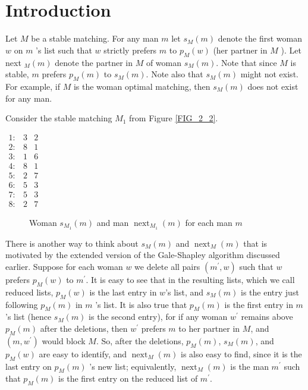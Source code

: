 \section{Introduction}
Let $M$ be a stable matching. For any man $m$ let $s_M(m)$ denote the first woman $w$ on $m$ 's list such that $w$ strictly prefers $m$ to $p_M(w)$ (her partner in $M$ ). Let next $_M(m)$ denote the partner in $M$ of woman $s_M(m)$. Note that since $M$ is stable, $m$ prefers $p_M(m)$ to $s_M(m)$. Note also that $s_M(m)$ might not exist. For example, if $M$ is the woman optimal matching, then $s_M(m)$ does not exist for any man.

\begin{exmp}\label{exmp_3_1}
Consider the stable matching $M_1$ from Figure \ref{FIG_2_2}. 

\begin{center}
    $\begin{array}{lll}1: & 3 & 2 \\ 2: & 8 & 1 \\ 3: & 1 & 6 \\ 4: & 8 & 1 \\ 5: & 2 & 7 \\ 6: & 5 & 3 \\ 7: & 5 & 3 \\ 8: & 2 & 7\end{array}$

    \begin{figure}[ht]
  \centering
  \caption{Woman $s_{M_1}(m)$ and man $\operatorname{next}_{M_1}(m)$ for each man $m$}
  \label{FIG_3_1}
\end{figure}
\end{center}
\end{exmp}

There is another way to think about $s_M(m)$ and $\operatorname{next}_M(m)$ that is motivated by the extended version of the Gale-Shapley algorithm discussed earlier. Suppose for each woman $w$ we delete all pairs $\left(m^{\prime}, w\right)$ such that $w$ prefers $p_M(w)$ to $m^{\prime}$. It is easy to see that in the resulting lists, which we call reduced lists, $p_M(w)$ is the last entry in $w$'s list, and $s_M(m)$ is the entry just following $p_M(m)$ in $m$ 's list. It is also true that $p_M(m)$ is the first entry in $m$'s list (hence $s_M(m)$ is the second entry), for if any woman $w^{\prime}$ remains above $p_M(m)$ after the deletions, then $w^{\prime}$ prefers $m$ to her partner in $M$, and $\left(m, w^{\prime}\right)$ would block $M$. So, after the deletions, $p_M(m)$, $s_M(m)$, and $p_M(w)$ are easy to identify, and $\operatorname{next}_M(m)$ is also easy to find, since it is the last entry on $p_M(m)$ 's new list; equivalently, $\operatorname{next}_M(m)$ is the man $m^{\prime}$ such that $p_M(m)$ is the first entry on the reduced list of $m^{\prime}$.

